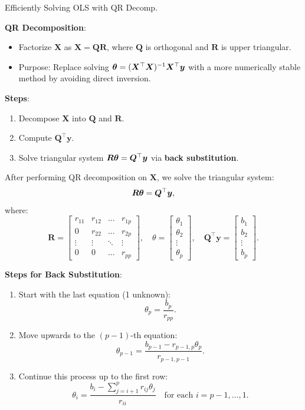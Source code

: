 \documentclass[11pt,compress,t,notes=noshow, xcolor=table]{beamer}
\begin{document}
\begin{vbframe}{Efficiently Solving OLS with QR Decomp.}

\textbf{QR Decomposition}:
\begin{itemize}
    \item Factorize \( \bm{X} \) as \( \bm{X} = \bm{Q}\bm{R} \), where \( \bm{Q} \) is orthogonal and \( \bm{R} \) is upper triangular.
    \item Purpose: Replace solving \( \bm{\theta} = (\bm{X}^{\top} \bm{X})^{-1} \bm{X}^{\top} \bm{y} \) with a more numerically stable method by avoiding direct inversion.
\end{itemize}

\textbf{Steps}:
\begin{enumerate}
    \item Decompose \( \bm{X} \) into \( \bm{Q} \) and \( \bm{R} \).
    \item Compute \( \bm{Q}^{\top} \bm{y} \).
    \item Solve triangular system \( \bm{R} \bm{\theta} = \bm{Q}^{\top} \bm{y} \) via \textbf{back substitution}.
\end{enumerate}

After performing QR decomposition on \( \bm{X} \), we solve the triangular system:
\[
\bm{R} \bm{\theta} = \bm{Q}^{\top} \bm{y},
\]
where:
\[
\bm{R} = \begin{bmatrix} 
r_{11} & r_{12} & \dots & r_{1p} \\ 
0 & r_{22} & \dots & r_{2p} \\ 
\vdots & \vdots & \ddots & \vdots \\ 
0 & 0 & \dots & r_{pp} 
\end{bmatrix}, \quad 
\theta = \begin{bmatrix} 
\theta_1 \\ 
\theta_2 \\ 
\vdots \\ 
\theta_p 
\end{bmatrix}, \quad \bm{Q}^{\top} \bm{y} = \begin{bmatrix} 
b_1 \\ 
b_2 \\ 
\vdots \\ 
b_p 
\end{bmatrix}.
\]

\textbf{Steps for Back Substitution}:
\begin{enumerate}
    \item Start with the last equation (1 unknown):
          \[
          \theta_p = \frac{b_p}{r_{pp}}.
          \]
    \item Move upwards to the \( (p-1) \)-th equation:
          \[
          \theta_{p-1} = \frac{b_{p-1} - r_{p-1,p} \theta_p}{r_{p-1,p-1}}.
          \]
    \item Continue this process up to the first row:
          \[
          \theta_i = \frac{b_i - \sum_{j=i+1}^p r_{ij} \theta_j}{r_{ii}} \quad \text{for each } i = p-1, \dots, 1.
          \]
\end{enumerate}


\end{vbframe}
\end{document}
